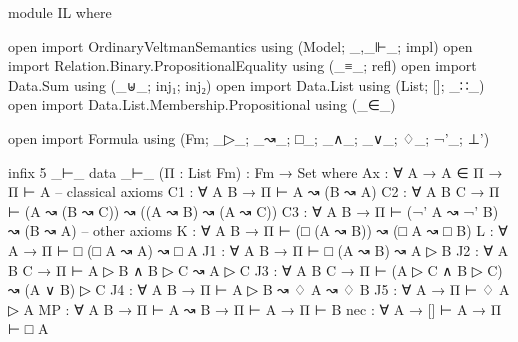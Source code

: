 \begin{spverbatim}
module IL where

open import OrdinaryVeltmanSemantics using (Model; _,_⊩_; impl)
open import Relation.Binary.PropositionalEquality using (_≡_; refl)
open import Data.Sum using (_⊎_; inj₁; inj₂)
open import Data.List using (List; []; _∷_)
open import Data.List.Membership.Propositional using (_∈_)

open import Formula using (Fm; _▷_; _↝_; □_; _∧_; _∨_; ♢_; ¬'_; ⊥')

infix 5 _⊢_
data _⊢_ (Π : List Fm) : Fm → Set where
  Ax : ∀ {A} → A ∈ Π → Π ⊢ A
  -- classical axioms
  C1 : ∀ {A B} → Π ⊢ A ↝ (B ↝ A)
  C2 : ∀ {A B C} → Π ⊢ (A ↝ (B ↝ C)) ↝ ((A ↝ B) ↝ (A ↝ C))
  C3 : ∀ {A B} → Π ⊢ (¬' A ↝ ¬' B) ↝ (B ↝ A)
  -- other axioms
  K : ∀ {A B} → Π ⊢ (□ (A ↝ B)) ↝ (□ A ↝ □ B)
  L : ∀ {A} → Π ⊢ □ (□ A ↝ A) ↝ □ A
  J1 : ∀ {A B} → Π ⊢ □ (A ↝ B) ↝ A ▷ B
  J2 : ∀ {A B C} → Π ⊢ A ▷ B ∧ B ▷ C ↝ A ▷ C
  J3 : ∀ {A B C} → Π ⊢ (A ▷ C ∧ B ▷ C) ↝ (A ∨ B) ▷ C
  J4 : ∀ {A B} → Π ⊢ A ▷ B ↝ ♢ A ↝ ♢ B
  J5 : ∀ {A} → Π ⊢ ♢ A ▷ A
  MP : ∀ {A B} → Π ⊢ A ↝ B → Π ⊢ A → Π ⊢ B
  nec : ∀ {A} → [] ⊢ A → Π ⊢ □ A
\end{spverbatim}
